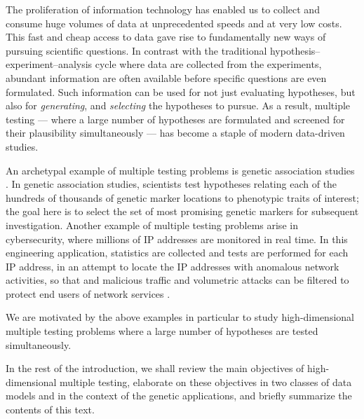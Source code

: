 
The proliferation of information technology has enabled us to collect and consume huge volumes of data at unprecedented speeds and at very low costs.
This fast and cheap access to data gave rise to fundamentally new ways of pursuing scientific questions.
In contrast with the traditional hypothesis--experiment--analysis cycle where data are collected from the experiments, abundant information are often available before specific questions are even formulated. 
Such information can be used for not just evaluating hypotheses, but also for \emph{generating}, and \emph{selecting} the hypotheses to pursue. 
As a result, {multiple testing} --- where a large number of hypotheses are formulated and screened for their plausibility simultaneously --- has become a staple of modern data-driven studies.

An archetypal example of multiple testing problems is genetic association studies \citep{bush2012genome}.
In genetic association studies, scientists test hypotheses relating each of the hundreds of thousands of genetic marker locations to phenotypic traits of interest;
the goal here is to select the set of most promising genetic markers for subsequent investigation.
Another example of multiple testing problems arise in cybersecurity, where millions of IP addresses are monitored in real time.
In this engineering application, statistics are collected and tests are performed for each IP address, in an attempt to locate the IP addresses with anomalous network activities, so that and malicious traffic and volumetric attacks can be filtered to protect end users of network services \citep{kallitsis2016amon}.

We are motivated by the above examples in particular to study {high-dimensional} multiple testing problems where a large number of hypotheses are tested simultaneously.


In the rest of the introduction, we shall review the main objectives of high-dimensional multiple testing, elaborate on these objectives in two classes of data models and in the context of the genetic applications, and briefly summarize the contents of this text.


